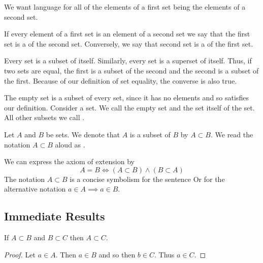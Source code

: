 
\sbasic





\sstart
{}


We want language for all of the elements of a first set being the elements of a second set.


If every element
of a first set is
an element of a
second set we say
that the first set
is a 
of the second set.
Conversely, we say that
second set is a
 of
the first set.

Every set is a subset of itself.
Similarly, every set is a
superset of itself.
Thus, if two sets are equal,
the first is a subset of the
second and the second is
a subset of the first.
Because of our definition
of set equality, the converse
is also true.

The empty set is a subset of every set,
since it has no elements and so satisfies
our definition.
Consider a set.
We call the empty set and the set itself
of the set.
All other subsets we call
.

Let $A$ and $B$ be sets.
We denote that $A$ is a subset of $B$ by $A \subset B$.
We read the notation $A \subset B$ aloud as .

We can express the axiom of extension by
\[
  A = B \Leftrightarrow (A \subset B) \land (B \subset A)
\]
The notation $A \subset B$
is a concise symbolism for
the sentence
 Or for the alternative notation
$a \in A \implies a \in B$.

\subsection{Immediate Results}

\begin{prop}
If $A \subset B$ and $B \subset C$ then $A \subset C$.
\begin{proof}
  Let $a \in A$. Then $a \in B$ and so then $b \in C$.
  Thus $a \in C$.
\end{proof}
\end{prop}
\strats
